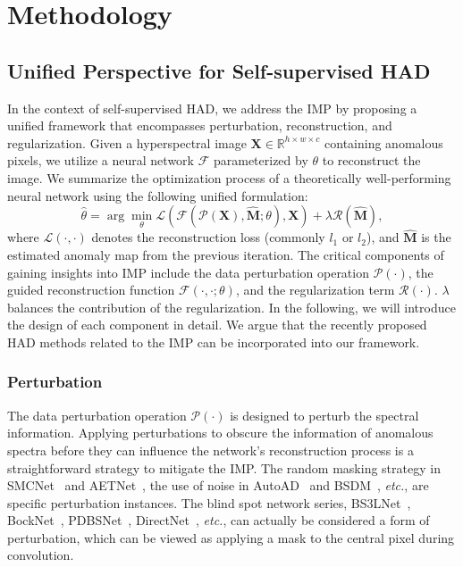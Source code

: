 


\section{Methodology}\label{Methodology}






\subsection{Unified Perspective for Self-supervised HAD}

In the context of self-supervised HAD, we address the IMP by proposing a unified framework that encompasses perturbation, reconstruction, and regularization. Given a hyperspectral image $\mathbf{X}\in \mathbb{R}^{h\times w \times c}$ containing anomalous pixels, we utilize a neural network $\mathcal{F}$ parameterized by $\theta$ to reconstruct the image. We summarize the optimization process of a theoretically well-performing neural network using the following unified formulation:
\begin{equation}
    \hat{\theta}  = \arg \min_{\theta}\mathcal{L} \left(\mathcal{F}\left(\mathcal{P}\left(\mathrm{\mathbf{X}}\right), \hat{\mathrm{\mathbf{M}}};\theta \right) , \mathrm{\mathbf{X}}\right) + \lambda \mathcal{R}(\hat{\mathrm{\mathbf{M}}}),
\end{equation}
where $\mathcal{L}(\cdot,\cdot)$ denotes the reconstruction loss (commonly $l_1$ or $l_2$), and $\hat{\mathbf{M}}$ is the estimated anomaly map from the previous iteration. The critical components of gaining insights into IMP include the data perturbation operation $\mathcal{P}(\cdot)$, the guided reconstruction function $\mathcal{F}(\cdot,\cdot;\theta)$, and the regularization term $\mathcal{R}(\cdot)$. $\lambda$ balances the contribution of the regularization. In the following, we will introduce the design of each component in detail. We argue that the recently proposed HAD methods related to the IMP can be incorporated into our framework.


\subsubsection{Perturbation}

The data perturbation operation $\mathcal{P}(\cdot)$ is designed to perturb the spectral information. Applying perturbations to obscure the information of anomalous spectra before they can influence the network's reconstruction process is a straightforward strategy to mitigate the IMP. The random masking strategy in SMCNet~\cite{SMCNet} and AETNet~\cite{AETNet}, the use of noise in AutoAD~\cite{AutoAD} and BSDM~\cite{BSDM}, \textit{etc.}, are specific perturbation instances. The blind spot network series, BS3LNet~\cite{BS3LNet}, BockNet~\cite{BockNet}, PDBSNet~\cite{PDBSNet}, DirectNet~\cite{DirectNet}, \textit{etc.}, can actually be considered a form of perturbation, which can be viewed as applying a mask to the central pixel during convolution.



